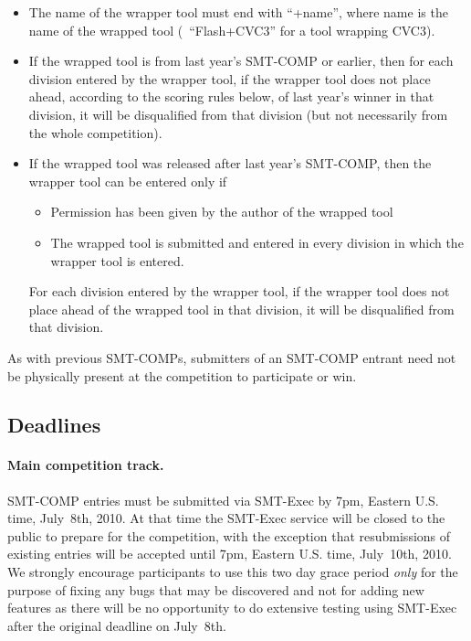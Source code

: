 \documentclass[12pt]{article}
\begin{document}
\begin{itemize}
\item The name of the wrapper tool must end with ``+name'', where name
is the name of the wrapped tool (\eg\ ``Flash+CVC3'' for a tool
wrapping CVC3).

\item If the wrapped tool is from last year's SMT-COMP or earlier, then for
each division entered by the wrapper tool, if the wrapper tool does not place ahead, according to the scoring
rules below, of last year's winner in that division, it will be disqualified
from that division (but not necessarily from the whole competition).

\item If the wrapped tool was released after last year's SMT-COMP,
then the wrapper tool can be entered only if

\begin{itemize}
\item Permission has been given by the author of the wrapped tool

\item The wrapped tool is submitted and entered in every division
      in which the wrapper tool is entered.
\end{itemize}

For each division entered by the wrapper tool, if the wrapper tool
does not place ahead of the wrapped tool in that division, it will be
disqualified from that division.
\end{itemize}

As with previous SMT-COMPs, submitters of an
SMT-COMP entrant need not be physically present at the competition to
participate or win.

\subsection*{Deadlines} %

\paragraph{Main competition track.} %
SMT-COMP entries must be submitted via SMT-Exec by 7pm, Eastern U.S.
time, July~8th, 2010.  At that time the SMT-Exec service will be
closed to the public to prepare for the competition, with the
exception that resubmissions of existing entries will be accepted
until 7pm, Eastern U.S. time, July~10th, 2010.  We strongly encourage
participants to use this two day grace period \emph{only} for the
purpose of fixing any bugs that may be discovered and not for adding
new features as there will be no opportunity to do extensive testing
using SMT-Exec after the original deadline on July~8th.
\end{document}
